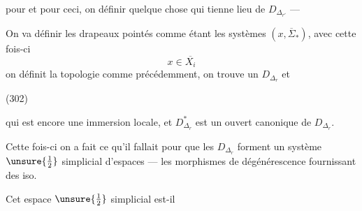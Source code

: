 
pour
et pour ceci, on   définir quelque chose qui tienne lieu de $D_{\Delta_{r'}}$ ---

On va définir les drapeaux pointés   comme étant les systèmes $(x,\overline{\Sigma}_*)$, avec cette fois-ci 
\[
x\in\overline{X_i}
\]
on définit la topologie comme précédemment, on trouve un $D_{\Delta_r}$ et

(302)\quad{}

qui est encore une immersion locale, et $D_{\Delta_r}^{*}$ est un ouvert canonique de $D_{\Delta_r}$.

Cette fois-ci on a fait ce qu'il fallait pour que les $D_{\Delta_r}$ forment un système $\unsure{\tfrac12}$ simplicial d'espaces --- les morphismes de dégénérescence fournissant des iso.

Cet espace $\unsure{\tfrac12}$ simplicial est-il

